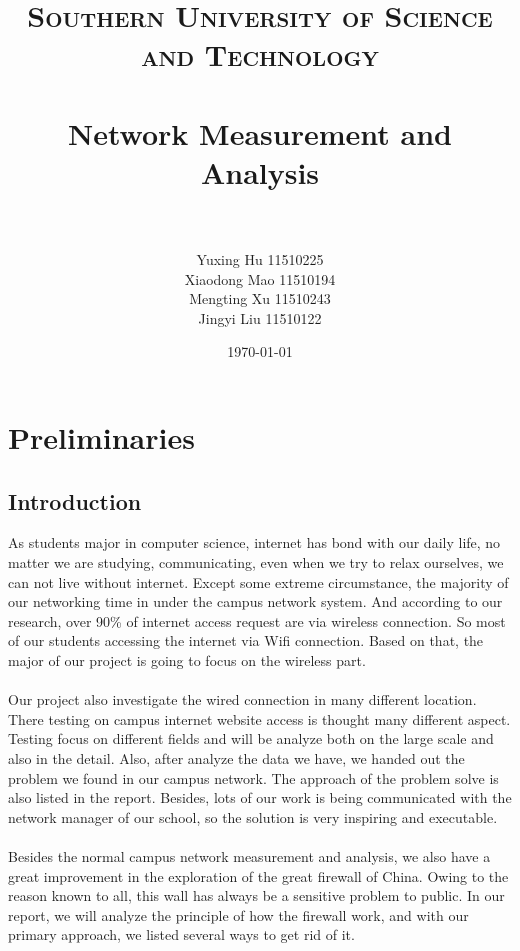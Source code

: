 \documentclass[paper=a4, fontsize=11pt]{scrartcl}
\title{	
\normalfont \normalsize 
\textsc{Southern University of Science and Technology} \\ [25pt] 
\horrule{0.5pt} \\[0.4cm] 
\huge Network Measurement and Analysis \\ 
\horrule{2pt} \\[0.5cm] 
}
\author{Yuxing Hu 11510225 \\
Xiaodong Mao 11510194 \\
Mengting Xu 11510243 \\
Jingyi Liu 11510122}
\date{\normalsize\today}
\numberwithin{equation}{section}
\numberwithin{figure}{section}
\numberwithin{table}{section}
\begin{document}
\maketitle 
\newpage
\tableofcontents
\newpage
\section{Preliminaries}
\subsection{Introduction}
As students major in computer science, internet has bond with our daily life, no matter we are studying, communicating, even when we try to relax ourselves, we can not live without internet. Except some extreme circumstance, the majority of our networking time in under the campus network system. And according to our research, over 90\% of internet access request are via wireless connection. So most of our students accessing the internet via Wifi connection. Based on that, the major of our project is going to focus on the wireless part. 
\paragraph{}
Our project also investigate the wired connection in many different location. There testing on campus internet website access is thought many different aspect. Testing focus on different fields and will be analyze both on the large scale and also in the detail. Also, after analyze the data we have, we handed out the problem we found in our campus network. The approach of the problem solve is also listed in the report. Besides, lots of our work is being communicated with the network manager of our school, so the solution is very inspiring and executable.
\paragraph{}
Besides the normal campus network measurement and analysis, we also have a great improvement in the exploration of the great firewall of China. Owing to the reason known to all, this wall has always be a sensitive problem to public. In our report, we will analyze the principle of how the firewall work, and with our primary approach, we listed several ways to get rid of it.
\end{document}
